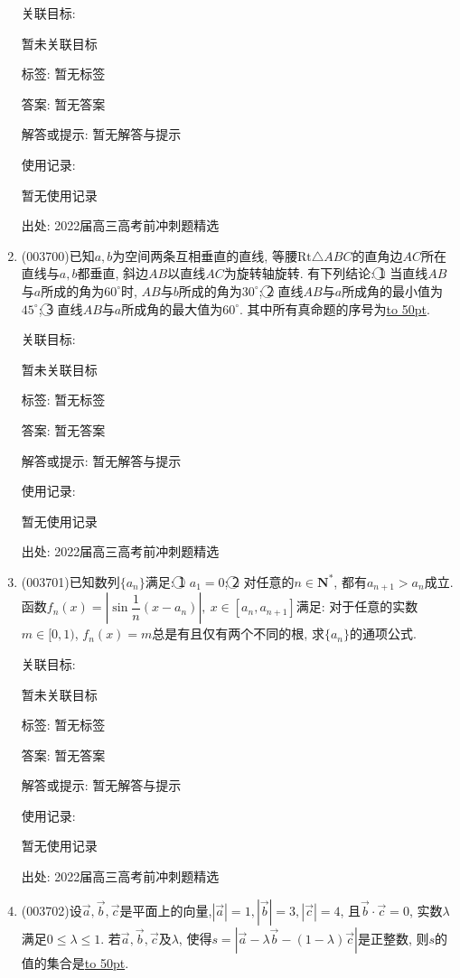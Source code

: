 \documentclass[10pt,a4paper]{article}
\newcommand{\blank}[1]{\underline{\hbox to #1pt{}}}
\begin{document}
\begin{enumerate}[1.]
关联目标:

暂未关联目标



标签: 暂无标签

答案: 暂无答案

解答或提示: 暂无解答与提示

使用记录:

暂无使用记录


出处: 2022届高三高考前冲刺题精选
\item { (003700)}已知$a,b$为空间两条互相垂直的直线, 等腰$\mathrm{Rt}\triangle ABC$的直角边$AC$所在直线与$a,b$都垂直, 斜边$AB$以直线$AC$为旋转轴旋转. 有下列结论: \textcircled{1} 当直线$AB$与$a$所成的角为$60^\circ$时, $AB$与$b$所成的角为$30^\circ$; \textcircled{2} 直线$AB$与$a$所成角的最小值为$45^\circ$; \textcircled{3} 直线$AB$与$a$所成角的最大值为$60^\circ$. 其中所有真命题的序号为\blank{50}.


关联目标:

暂未关联目标



标签: 暂无标签

答案: 暂无答案

解答或提示: 暂无解答与提示

使用记录:

暂无使用记录


出处: 2022届高三高考前冲刺题精选
\item { (003701)}已知数列$\{a_n\}$满足: \textcircled{1} $a_1=0$; \textcircled{2} 对任意的$n\in \mathbf{N}^*$, 都有$a_{n+1}>a_n$成立. 
函数$f_n(x)=|\sin \dfrac{1}{n}(x-a_n)|, \ x\in [a_n,a_{n+1}]$满足: 对于任意的实数$m\in [0,1)$, $f_n(x)=m$总是有且仅有两个不同的根, 求$\{a_n\}$的通项公式.


关联目标:

暂未关联目标



标签: 暂无标签

答案: 暂无答案

解答或提示: 暂无解答与提示

使用记录:

暂无使用记录


出处: 2022届高三高考前冲刺题精选
\item { (003702)}设$\overrightarrow a,\overrightarrow b,\overrightarrow c$是平面上的向量,$|\overrightarrow a| =1,|\overrightarrow b| =3,|\overrightarrow c|=4$, 且$\overrightarrow b\cdot \overrightarrow c=0$, 实数$\lambda$满足$0 \le \lambda \le 1$. 若$\overrightarrow a,\overrightarrow b,\overrightarrow c$及$\lambda$, 使得$s=|\overrightarrow a-\lambda \overrightarrow b-(1-\lambda)\overrightarrow c|$是正整数, 则$s$的值的集合是\blank{50}.



\end{enumerate}
\end{document}
